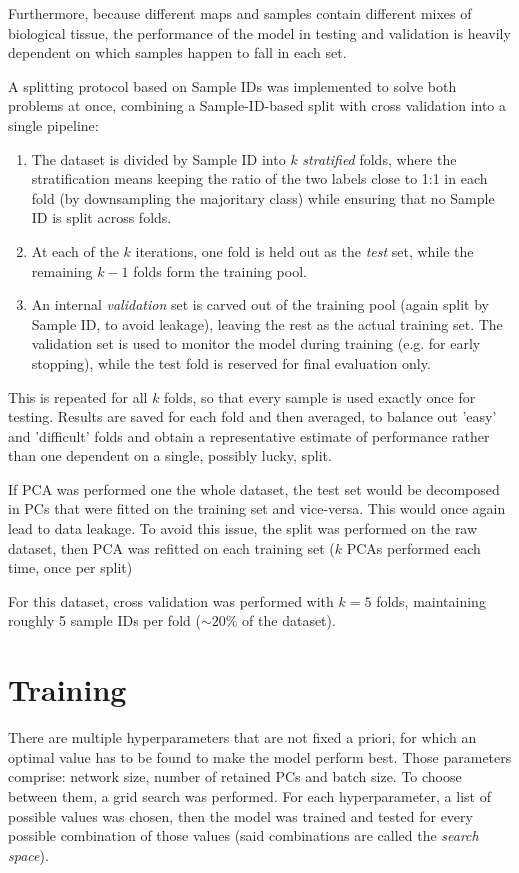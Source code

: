 Furthermore, because different maps and samples contain different mixes of biological tissue, the performance of the model in testing and validation is heavily dependent on which samples happen to fall in each set.

A splitting protocol based on Sample IDs was implemented to solve both problems at once, combining a Sample-ID-based split with cross validation into a single pipeline:
\begin{enumerate}
    \item The dataset is divided by Sample ID into $k$ \textit{stratified} folds, where the stratification means keeping the ratio of the two labels close to 1:1 in each fold (by downsampling the majoritary class) while ensuring that no Sample ID is split across folds.
    \item At each of the $k$ iterations, one fold is held out as the \textit{test} set, while the remaining $k-1$ folds form the training pool.
    \item An internal \textit{validation} set is carved out of the training pool (again split by Sample ID, to avoid leakage), leaving the rest as the actual training set. The validation set is used to monitor the model during training (e.g. for early stopping), while the test fold is reserved for final evaluation only.
\end{enumerate}

This is repeated for all $k$ folds, so that every sample is used exactly once for testing. Results are saved for each fold and then averaged, to balance out 'easy' and 'difficult' folds and obtain a representative estimate of performance rather than one dependent on a single, possibly lucky, split.

If PCA was performed one the whole dataset, the test set would be decomposed in PCs that were fitted on the training set and vice-versa. This would once again lead to data leakage. To avoid this issue, the split was performed on the raw dataset, then PCA was refitted on each training set ($k$ PCAs performed each time, once per split)

For this dataset, cross validation was performed with $k=5$ folds, maintaining roughly 5 sample IDs per fold ($\sim20\%$ of the dataset).


\section{Training}
\label{sec:training}

There are multiple hyperparameters that are not fixed a priori, for which an optimal value has to be found to make the model perform best. Those parameters comprise: network size, number of retained PCs and batch size.
To choose between them, a grid search was performed. For each hyperparameter, a list of possible values was chosen, then the model was trained and tested for every possible combination of those values (said combinations are called the \textit{search space}).

